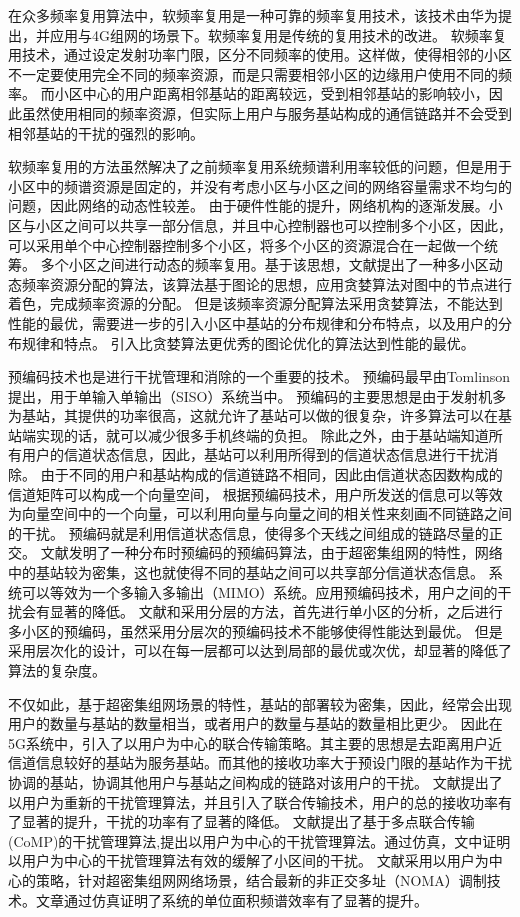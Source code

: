 在众多频率复用算法中，软频率复用是一种可靠的频率复用技术，该技术由华为提出，并应用与4G组网的场景下。软频率复用是传统的复用技术的改进。
软频率复用技术，通过设定发射功率门限，区分不同频率的使用。这样做，使得相邻的小区不一定要使用完全不同的频率资源，而是只需要相邻小区的边缘用户使用不同的频率。
而小区中心的用户距离相邻基站的距离较远，受到相邻基站的影响较小，因此虽然使用相同的频率资源，但实际上用户与服务基站构成的通信链路并不会受到相邻基站的干扰的强烈的影响。

软频率复用的方法虽然解决了之前频率复用系统频谱利用率较低的问题，但是用于小区中的频谱资源是固定的，并没有考虑小区与小区之间的网络容量需求不均匀的问题，因此网络的动态性较差。
由于硬件性能的提升，网络机构的逐渐发展。小区与小区之间可以共享一部分信息，并且中心控制器也可以控制多个小区，因此，可以采用单个中心控制器控制多个小区，将多个小区的资源混合在一起做一个统筹。
多个小区之间进行动态的频率复用。基于该思想，文献\cite{4LRA}提出了一种多小区动态频率资源分配的算法，该算法基于图论的思想，应用贪婪算法对图中的节点进行着色，完成频率资源的分配。
但是该频率资源分配算法采用贪婪算法，不能达到性能的最优，需要进一步的引入小区中基站的分布规律和分布特点，以及用户的分布规律和特点。
引入比贪婪算法更优秀的图论优化的算法达到性能的最优。

预编码技术也是进行干扰管理和消除的一个重要的技术。
预编码最早由Tomlinson提出，用于单输入单输出（SISO）系统当中。
预编码的主要思想是由于发射机多为基站，其提供的功率很高，这就允许了基站可以做的很复杂，许多算法可以在基站端实现的话，就可以减少很多手机终端的负担。
除此之外，由于基站端知道所有用户的信道状态信息，因此，基站可以利用所得到的信道状态信息进行干扰消除。
由于不同的用户和基站构成的信道链路不相同，因此由信道状态因数构成的信道矩阵可以构成一个向量空间，
根据预编码技术，用户所发送的信息可以等效为向量空间中的一个向量，可以利用向量与向量之间的相关性来刻画不同链路之间的干扰。
预编码就是利用信道状态信息，使得多个天线之间组成的链路尽量的正交。
文献\cite{DisPrecode}发明了一种分布时预编码的预编码算法，由于超密集组网的特性，网络中的基站较为密集，这也就使得不同的基站之间可以共享部分信道状态信息。
系统可以等效为一个多输入多输出（MIMO）系统。应用预编码技术，用户之间的干扰会有显著的降低。
文献\cite{LayerPrecode}和\cite{Layer2Precode}采用分层的方法，首先进行单小区的分析，之后进行多小区的预编码，虽然采用分层次的预编码技术不能够使得性能达到最优。
但是采用层次化的设计，可以在每一层都可以达到局部的最优或次优，却显著的降低了算法的复杂度。

不仅如此，基于超密集组网场景的特性，基站的部署较为密集，因此，经常会出现用户的数量与基站的数量相当，或者用户的数量与基站的数量相比更少。
因此在5G系统中，引入了以用户为中心的联合传输策略。其主要的思想是去距离用户近信道信息较好的基站为服务基站。而其他的接收功率大于预设门限的基站作为干扰协调的基站，协调其他用户与基站之间构成的链路对该用户的干扰。
文献\cite{Ucent}提出了以用户为重新的干扰管理算法，并且引入了联合传输技术，用户的总的接收功率有了显著的提升，干扰的功率有了显著的降低。
文献\cite{CoMPUDN}提出了基于多点联合传输(CoMP)的干扰管理算法,提出以用户为中心的干扰管理算法。通过仿真，文中证明以用户为中心的干扰管理算法有效的缓解了小区间的干扰。
文献\cite{UNOMAcent}采用以用户为中心的策略，针对超密集组网网络场景，结合最新的非正交多址（NOMA）调制技术。文章通过仿真证明了系统的单位面积频谱效率有了显著的提升。

